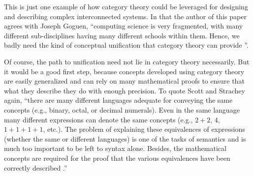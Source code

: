 \documentclass{article}
\begin{document}
This is just one example of how category theory could be leveraged for designing and
describing complex interconnected systems. In that the author of this paper agrees with Joseph
Goguen, “computing science is very fragmented, with many different sub-disciplines having many
different schools within them. Hence, we badly need the kind of conceptual unification that
category theory can provide \cite{Goguen2}”.

Of course, the path to unification need not lie in category theory necessarily. But it would be
a good first step, because concepts developed using category theory are easily generalized and can
rely on many mathematical proofs to ensure that what they describe they do with enough precision.
To quote Scott and Strachey again, “there are many different languages adequate for conveying the
same concepts (e.g., binary, octal, or decimal numerals). Even in the same language many different
expressions can denote the same concepts (e.g., $2+2$, $4$, $1+1+1+1$, etc.). The problem of explaining
these equivalences of expressions (whether the same or different languages) is one of the tasks of
semantics and is much too important to be left to syntax alone. Besides, the mathematical concepts
are required for the proof that the various equivalences have been correctly described \cite{Scott}.”
\end{document}
